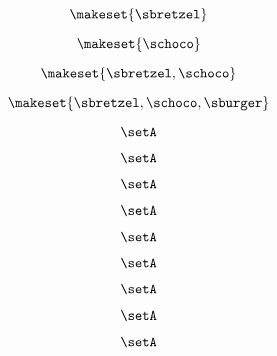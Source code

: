 \begin{forslides}
    \begin{equation}
        \label{eq:feedback-156}
        \makeset{ \sbretzel }
    \end{equation}

    \begin{equation}
        \label{eq:feedback-157}
        \makeset{ \schoco }
    \end{equation}

    \begin{equation}
        \label{eq:feedback-158}
        \makeset{ \sbretzel, \schoco }
    \end{equation}

    \begin{equation}
        \label{eq:feedback-159}
        \makeset{ \sbretzel, \schoco, \sburger }
    \end{equation}

    \begin{equation}
        \label{eq:feedback-160}
        \setA
    \end{equation}

    \begin{equation}
        \label{eq:feedback-161}
        \setA
    \end{equation}

    \begin{equation}
        \label{eq:feedback-162}
        \setA
    \end{equation}

    \begin{equation}
        \label{eq:feedback-163}
        \setA
    \end{equation}

    \begin{equation}
        \label{eq:feedback-164}
        \setA
    \end{equation}

    \begin{equation}
        \label{eq:feedback-165}
        \setA
    \end{equation}

    \begin{equation}
        \label{eq:feedback-166}
        \setA
    \end{equation}

    \begin{equation}
        \label{eq:feedback-167}
        \setA
    \end{equation}

    \begin{equation}
        \label{eq:feedback-168}
        \setA
    \end{equation}


\end{forslides}
